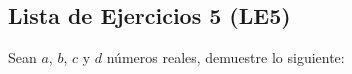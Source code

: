 \documentclass[11pt]{article}
\newcommand{\R}{\mathbb{R}}
\newcommand{\bfit}[1]{\textbf{\textit{#1}}}
\begin{document}
\subsection*{Lista de Ejercicios 5 (LE5)}
Sean $a$, $b$, $c$ y $d$ números reales, demuestre lo siguiente:
\begin{enumerate}[label=\alph*)]

\end{enumerate}
\end{document}
